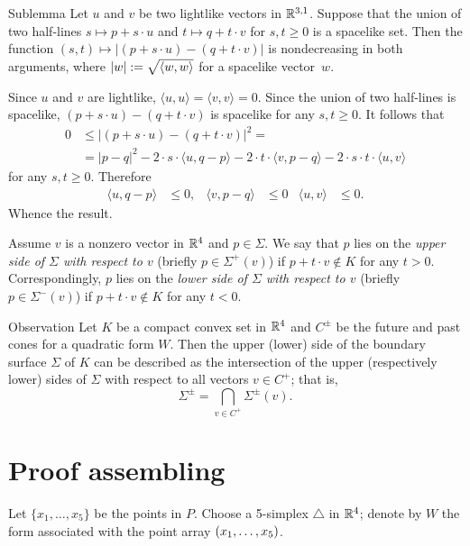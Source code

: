 \documentclass{article}
\begin{document}
\begin{thm}{Sublemma}
Let $u$ and $v$ be two lightlike vectors in $\mathbb{R}^{3,1}$.
Suppose that the union of two half-lines $s\mapsto p+s\cdot u$ and $t\mapsto q+t\cdot v$ for $s,t\ge 0$ is a spacelike set.
Then the function 
$(s,t)\mapsto |(p+s\cdot u)-(q+t\cdot v)|$
is nondecreasing in both arguments,
where $|w|\mathrel{:=}\sqrt{\langle w,w\rangle}$ for a spacelike vector~$w$.
\end{thm}

Since $u$ and $v$ are lightlike, $\langle u,u\rangle=\langle v,v\rangle=0$.
Since the union of two half-lines is spacelike, $(p+s\cdot u)-(q+t\cdot v)$ is spacelike for any $s,t\ge 0$.
It follows that
\begin{align*}
0&\le |(p+s\cdot u)-(q+t\cdot v)|^2=
\\
&=|p-q|^2-2\cdot s \cdot\langle u,q-p\rangle-2\cdot t\cdot\langle v,p-q\rangle- 2\cdot s\cdot t\cdot \langle u,v\rangle
\end{align*}
for any $s,t\ge0$.
Therefore
\begin{align*}
\langle u,q-p\rangle&\le 0,
& 
\langle v,p-q\rangle&\le 0
&
\langle u,v\rangle&\le 0.
\end{align*}
Whence the result.
\qeds


Assume $v$ is a nonzero vector in $\mathbb{R}^4$ and $p\in\Sigma$.
We say that $p$ lies on the \emph{upper side of $\Sigma$ with respect to $v$} (briefly $p\in \Sigma^+(v)$) if $p+t\cdot v\notin K$ for any $t>0$.
Correspondingly, $p$ lies on the \emph{lower side of $\Sigma$ with respect to $v$} (briefly $p\in \Sigma^-(v)$) if $p+t\cdot v\notin K$ for any $t<0$.

\begin{thm}{Observation}\label{obs:Sigma(v)}
Let $K$ be a compact convex set in $\mathbb{R}^4$ and $C^\pm$ be the future and past cones for a quadratic form $W$.
Then the upper (lower) side of the boundary surface $\Sigma$ of $K$ can be described as the intersection of the upper (respectively lower) sides of $\Sigma$ with respect to all vectors $v\in C^+$;
that is,
\[\Sigma^\pm=\bigcap_{v\in C^+}\Sigma^\pm(v).\]
\end{thm}

\section{Proof assembling}

Let $\{x_1,\dots,x_5\}$ be the points in $P$.
Choose a 5-simplex $\triangle$ in $\mathbb{R}^4$; denote by $W$ the form associated with the point array $(x_1,\z\dots,x_5)$.
\end{document}

